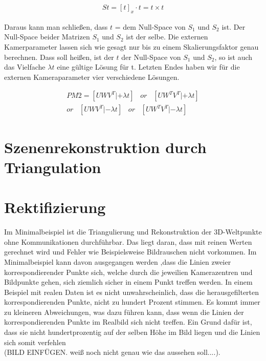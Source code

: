 \begin{gather}
St = [t]_x \cdot t = t \times t
\end{gather} 

Daraus kann man schließen, dass \ensuremath{t} = dem Null-Space von \ensuremath{S_1} und \ensuremath{S_2} ist. Der Null-Space beider Matrizen \ensuremath{S_1} und \ensuremath{S_2} ist der selbe. Die externen Kamerparameter lassen sich wie gesagt nur bis zu einem Skalierungsfaktor genau berechnen. Dass soll heißen, ist der \ensuremath{t} der Null-Space von \ensuremath{S_1} und \ensuremath{S_2}, so ist auch das Vielfache \ensuremath{\lambda t} eine gültige Lösung für t. Letzten Endes haben wir für die externen Kameraparameter vier verschiedene Lösungen. 

\begin{gather}
PM2 = [UWV^T|+\lambda t] \;\;\; or \;\;\;[UW^TV^T|+\lambda t]\\
or\;\;\; [UWV^T|-\lambda t] \;\;\; or \;\;\;[UW^TV^T|-\lambda t]
\end{gather}
\section{Szenenrekonstruktion durch Triangulation}

\section{Rektifizierung}

Im Minimalbeispiel ist die Triangulierung und Rekonstruktion der 3D-Weltpunkte ohne Kommunikationen durchführbar. Das liegt daran, dass mit reinen Werten gerechnet wird und Fehler wie Beispielsweise Bildrauschen nicht vorkommen. Im Minimalbeispiel kann davon ausgegangen werden ,dass die Linien zweier korrespondierender Punkte sich, welche durch die jeweilien Kamerazentren und Bildpunkte gehen, sich ziemlich sicher in einem Punkt treffen werden. In einem Beispiel mit realen Daten ist es nicht unwahrscheinlich, dass die herausgefilterten korrespondierenden Punkte, nicht zu hundert Prozent stimmen. Es kommt immer zu kleineren Abweichungen, was dazu führen kann, dass wenn die Linien der korrespondierenden Punkte im Realbild sich nicht treffen. Ein Grund dafür ist, dass sie nicht hundertprozentig auf der selben Höhe im Bild liegen und die Linien sich somit verfehlen\\



 (BILD EINFÜGEN. weiß noch nicht genau wie das aussehen soll....).\\




